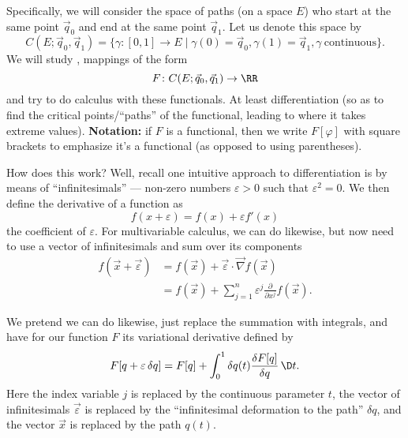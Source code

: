 Specifically, we will consider the space of paths (on a space $E$) who
start at the same point $\vec{q}_{0}$ and end at the same point
$\vec{q}_{1}$. Let us denote this space by
\begin{equation}
C(E; \vec{q}_{0},\vec{q}_{1}) = \{\gamma\colon[0,1]\to E\mid\gamma(0)=\vec{q}_{0},\gamma(1)=\vec{q}_{1},\gamma~\mbox{continuous}\}.
\end{equation}
We will study , mappings of the form
\begin{equation}
F\colon C(E; \vec{q}_{0},\vec{q}_{1})\to\RR
\end{equation}
and try to do calculus with these functionals. At least differentiation
(so as to find the critical points/``paths'' of the functional, leading
to where it takes extreme values). \textbf{Notation:} if $F$ is a
functional, then we write $F[\varphi]$ with square brackets to emphasize
it's a functional (as opposed to using parentheses).

How does this work? Well, recall one intuitive approach to
differentiation is by means of ``infinitesimals'' --- non-zero numbers
$\varepsilon>0$ such that $\varepsilon^{2}=0$. We then define the
derivative of a function as
\begin{equation}
f(x + \varepsilon) = f(x) + \varepsilon f'(x) 
\end{equation}
the coefficient of $\varepsilon$. For multivariable calculus, we can do
likewise, but now need to use a vector of infinitesimals and sum over
its components
\begin{equation}
  \begin{split}
f(\vec{x} + \vec{\varepsilon}) &= f(\vec{x}) + \vec{\varepsilon}\cdot\vec{\nabla}f(\vec{x})\\
&= f(\vec{x}) + \sum^{n}_{j=1}\varepsilon^{j}\frac{\partial}{\partial x^{j}}f(\vec{x}).
  \end{split}
\end{equation}

We pretend we can do likewise, just replace the summation with
integrals, and have for our function $F$ its variational derivative defined by
\begin{equation}
F[q + \varepsilon\,\delta q] = F[q] + \int^{1}_{0}\delta
q(t)\frac{\delta F[q]}{\delta q}\,\D t.
\end{equation}
Here the index variable $j$ is replaced by the continuous parameter $t$,
the vector of infinitesimals $\vec{\varepsilon}$ is replaced by the
``infinitesimal deformation to the path'' $\delta q$, and the vector
$\vec{x}$ is replaced by the path $q(t)$.

